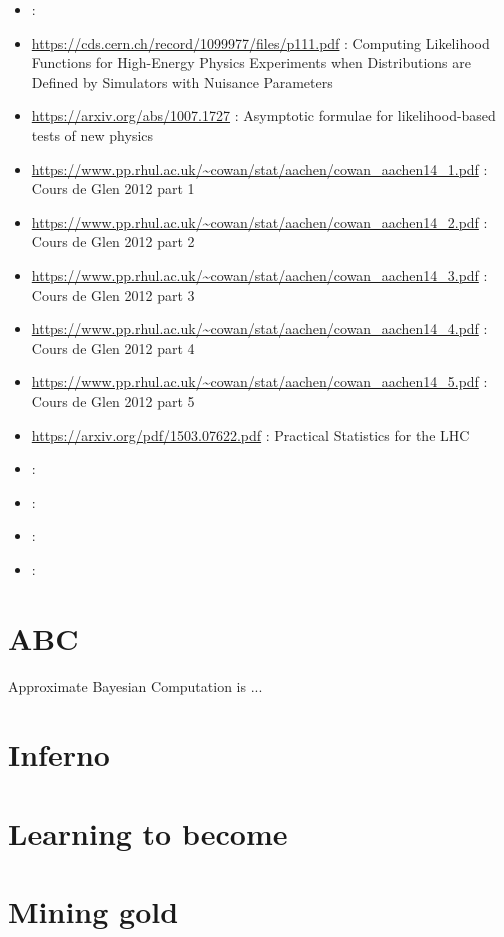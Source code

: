 \begin{itemize}
    \item \url{} : 
    \item \url{https://cds.cern.ch/record/1099977/files/p111.pdf} : Computing Likelihood Functions for High-Energy Physics Experiments when Distributions are Defined by Simulators with Nuisance Parameters
    \item \url{https://arxiv.org/abs/1007.1727} : Asymptotic formulae for likelihood-based tests of new physics
    \item \url{https://www.pp.rhul.ac.uk/~cowan/stat/aachen/cowan_aachen14_1.pdf} : Cours de Glen 2012 part 1
    \item \url{https://www.pp.rhul.ac.uk/~cowan/stat/aachen/cowan_aachen14_2.pdf} : Cours de Glen 2012 part 2
    \item \url{https://www.pp.rhul.ac.uk/~cowan/stat/aachen/cowan_aachen14_3.pdf} : Cours de Glen 2012 part 3
    \item \url{https://www.pp.rhul.ac.uk/~cowan/stat/aachen/cowan_aachen14_4.pdf} : Cours de Glen 2012 part 4
    \item \url{https://www.pp.rhul.ac.uk/~cowan/stat/aachen/cowan_aachen14_5.pdf} : Cours de Glen 2012 part 5
    \item \url{https://arxiv.org/pdf/1503.07622.pdf} : Practical Statistics for the LHC
    \item \url{} : 
    \item \url{} : 
    \item \url{} : 
    \item \url{} : 
\end{itemize}


\section{ ABC }

Approximate Bayesian Computation is ...

\section{ Inferno }
\section{ Learning to become }

\section{ Mining gold }

